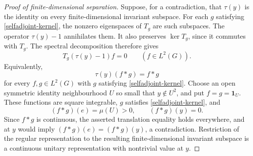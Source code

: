 \begin{proof}[Proof of finite-dimensional separation]
Suppose, for a contradiction, that $\tau(y)$ is the identity on every
finite-dimensional invariant subspace. For each $g$ satisfying
\eqref{selfadjoint-kernel}, the nonzero eigenspaces of $T_g$ are such
subspaces. The operator $\tau(y)-1$ annihilates them. It also preserves
$\ker T_g$, since it commutes with $T_g$. The spectral decomposition
therefore gives
\[
 T_g(\tau(y)-1)f=0\qquad(f\in L^2(G)).
\]
Equivalently,
\[
 \tau(y)(f*g)=f*g
\]
for every $f,g\in L^2(G)$ with $g$ satisfying \eqref{selfadjoint-kernel}.
Choose an open symmetric identity neighbourhood $U$ so small that
$y\notin U^2$, and put $f=g=\mathbf1_U$. These functions are square
integrable, $g$ satisfies \eqref{selfadjoint-kernel}, and
\[
 (f*g)(e)=\mu(U)>0,\qquad (f*g)(y)=0.
\]
Since $f*g$ is continuous, the asserted translation equality holds
everywhere, and at $y$ would imply $(f*g)(e)=(f*g)(y)$, a contradiction.
Restriction of the regular representation to the resulting
finite-dimensional invariant subspace is a continuous unitary
representation with nontrivial value at $y$.
\end{proof}
